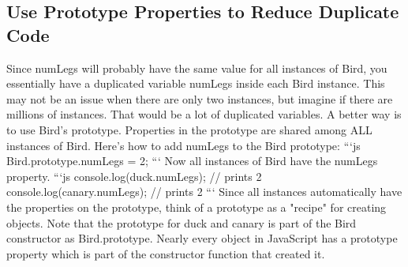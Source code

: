 \documentclass{article}%
\begin{document}
\subsection{Use Prototype Properties to Reduce Duplicate Code}%
\label{subsec:UsePrototypePropertiestoReduceDuplicateCode}%
Since numLegs will probably have the same value for all instances of Bird, you essentially have a duplicated variable numLegs inside each Bird instance.\newline%
This may not be an issue when there are only two instances, but imagine if there are millions of instances. That would be a lot of duplicated variables.\newline%
A better way is to use Bird’s prototype. Properties in the prototype are shared among ALL instances of Bird. Here's how to add numLegs to the Bird prototype:\newline%
```js\newline%
Bird.prototype.numLegs = 2;\newline%
```\newline%
Now all instances of Bird have the numLegs property.\newline%
```js\newline%
console.log(duck.numLegs);  // prints 2\newline%
console.log(canary.numLegs);  // prints 2\newline%
```\newline%
Since all instances automatically have the properties on the prototype, think of a prototype as a "recipe" for creating objects.\newline%
Note that the prototype for duck and canary is part of the Bird constructor as Bird.prototype. Nearly every object in JavaScript has a prototype property which is part of the constructor function that created it.\newline%

%
\end{document}
